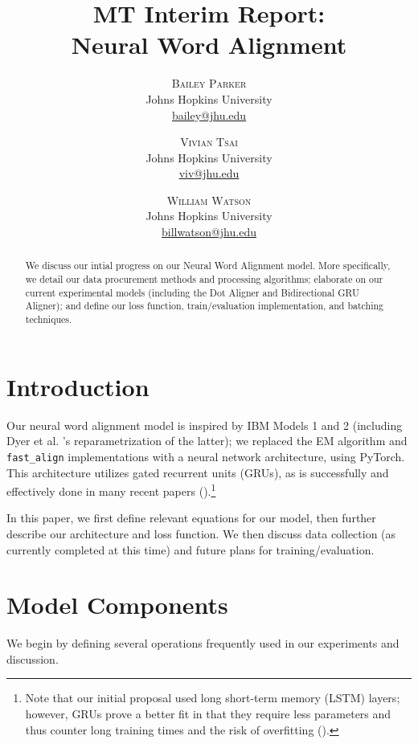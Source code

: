 \documentclass[twoside,twocolumn]{article}
\title{MT Interim Report: \\ Neural Word Alignment}
\author{%
\textsc{Bailey Parker} \\[1ex]
\normalsize Johns Hopkins University \\
\normalsize \href{mailto:bailey@jhu.edu}{bailey@jhu.edu}
 \and
 \textsc{Vivian Tsai} \\[1ex]
\normalsize Johns Hopkins University \\
\normalsize \href{mailto:viv@jhu.edu}{viv@jhu.edu}
 \and
  \textsc{William Watson} \\[1ex]
\normalsize Johns Hopkins University \\
\normalsize \href{mailto:billwatson@jhu.edu}{billwatson@jhu.edu}
}
\date{}
\begin{document}
\maketitle




\begin{abstract}
We discuss our intial progress on our Neural Word Alignment model. More
specifically, we detail our data procurement methods and processing algorithms;
elaborate on our current experimental models (including the Dot Aligner and
Bidirectional GRU Aligner); and define our loss function, train/evaluation
implementation, and batching techniques.
\end{abstract}

\section{Introduction}
Our neural word alignment model is inspired by IBM Models 1 and 2 (including
Dyer et al. \cite{dyer2013simple}'s reparametrization of the latter); we
replaced the EM algorithm and \verb|fast_align| implementations with a neural
network architecture, using PyTorch. This architecture utilizes gated recurrent
units (GRUs), as is successfully and effectively done in many recent papers
(\cite{bahdanau2014neural}).\footnote{Note that our initial proposal used
long short-term memory (LSTM) layers; however, GRUs prove a better fit in that
they require less parameters and thus counter long training times and the risk
of overfitting (\cite{koehn2019neural}).}

In this paper, we first define relevant equations for our model, then further
describe our architecture and loss function. We then discuss data collection
(as currently completed at this time) and future plans for training/evaluation. 

\section{Model Components}
We begin by defining several operations frequently used in our experiments
and discussion.
\end{document}
